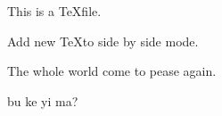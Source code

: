 \documentclass{article}
\begin{document}
This is a \TeX file.

Add new \TeX to side by side mode.

The whole world come to pease again.

bu ke yi ma?
\end{document}
